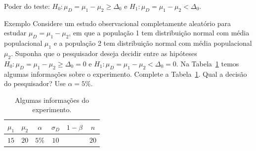 \documentclass[9pt]{beamer}
\begin{document}
\begin{frame}{Poder do teste: $H_0:\mu_D = \mu_1 - \mu_2 \geq \Delta_0$ e $H_1:\mu_D =  \mu_1 - \mu_2 < \Delta_0$.}

\begin{block}{Exemplo}
	Considere um estudo observacional completamente aleatório para estudar $\mu_D = \mu_1 - \mu_2$, em que a população 1 tem distribuição normal com média populacional $\mu_1$ e a população 2 tem distribuição normal com média populacional $\mu_2$. Suponha que o pesquisador deseja decidir entre as hipóteses $H_0:\mu_D = \mu_1 - \mu_2 \geq \Delta_0=0$ e $H_1: \mu_D = \mu_1 - \mu_2 < \Delta_0=0$. Na Tabela~\ref{tab:test-t-pareado-h1-upper-power} temos algumas informações sobre o experimento. Complete a Tabela~\ref{tab:test-t-pareado-h1-upper-power}. Qual a decisão do pesquisador? Use $\alpha = 5\%$.
	
	\begin{table}[htbp]
		\centering
		\begin{tabular}{c|c|c|c|c|c}
			\toprule[0.05cm]
			$\mu_1$ & $\mu_2$ & $\alpha$ & 			$\sigma_D$ & $1-\beta$ & $n$ \\ \midrule[0.025cm]
			$15$ & $20$ & $5\%$ & $10$ &  & $20$  \\ \bottomrule[0.05cm]
		\end{tabular}
		\caption{Algumas informações do experimento.}
		\label{tab:test-t-pareado-h1-upper-power}
	\end{table}
\end{block}

\end{frame}
\end{document}
